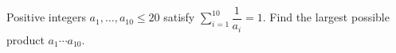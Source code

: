 Positive integers $a_1,\ldots,a_{10}\le20$ satisfy $\sum_{i=1}^{10}\dfrac{1}{a_i}=1$. Find the largest possible product $a_1\cdots a_{10}$.
